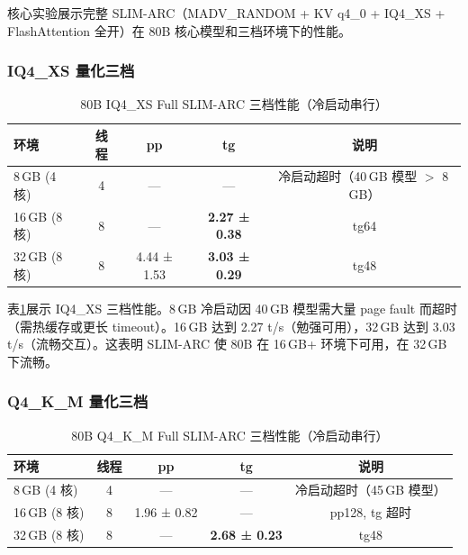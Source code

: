\label{sec:eval_core}

核心实验展示完整 SLIM-ARC（MADV\_RANDOM + KV q4\_0 + IQ4\_XS + FlashAttention 全开）在 80B 核心模型和三档环境下的性能。

\subsubsection{IQ4\_XS 量化三档}

\begin{table}[H]
    \centering
    \caption{80B IQ4\_XS Full SLIM-ARC 三档性能（冷启动串行）}
    \label{tab:core_iq4xs}
    \begin{tabular}{lcccc}
        \toprule
        \textbf{环境} & \textbf{线程} & \textbf{pp} & \textbf{tg} & \textbf{说明} \\
        \midrule
        8\,GB (4 核) & 4 & --- & --- & 冷启动超时（40\,GB 模型 $>$ 8\,GB） \\
        16\,GB (8 核) & 8 & --- & \textbf{2.27 ± 0.38} & tg64 \\
        32\,GB (8 核) & 8 & 4.44 ± 1.53 & \textbf{3.03 ± 0.29} & tg48 \\
        \bottomrule
    \end{tabular}
\end{table}

表\ref{tab:core_iq4xs}展示 IQ4\_XS 三档性能。8\,GB 冷启动因 40\,GB 模型需大量 page fault 而超时（需热缓存或更长 timeout）。16\,GB 达到 2.27 t/s（勉强可用），32\,GB 达到 3.03 t/s（流畅交互）。这表明 SLIM-ARC 使 80B 在 16\,GB+ 环境下可用，在 32\,GB 下流畅。

\subsubsection{Q4\_K\_M 量化三档}

\begin{table}[H]
    \centering
    \caption{80B Q4\_K\_M Full SLIM-ARC 三档性能（冷启动串行）}
    \label{tab:core_q4km}
    \begin{tabular}{lcccc}
        \toprule
        \textbf{环境} & \textbf{线程} & \textbf{pp} & \textbf{tg} & \textbf{说明} \\
        \midrule
        8\,GB (4 核) & 4 & --- & --- & 冷启动超时（45\,GB 模型） \\
        16\,GB (8 核) & 8 & 1.96 ± 0.82 & --- & pp128, tg 超时 \\
        32\,GB (8 核) & 8 & --- & \textbf{2.68 ± 0.23} & tg48 \\
        \bottomrule
    \end{tabular}
\end{table}

